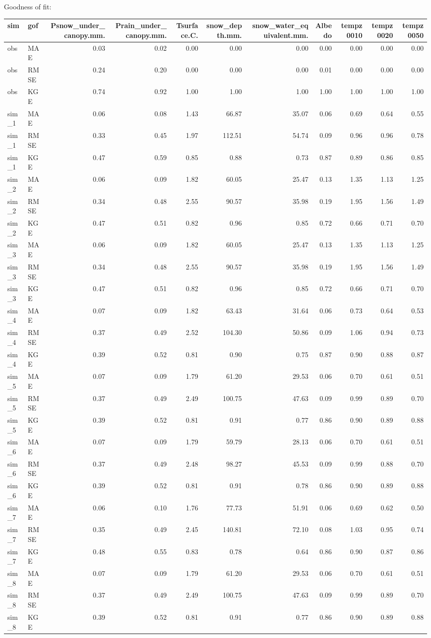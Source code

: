 \documentclass[
]{article}
\begin{document}
Goodness of fit:

\begin{longtable}[]{@{}llrrrrrrrrr@{}}
\toprule
sim & gof & Psnow\_under\_canopy.mm. & Prain\_under\_canopy.mm. &
Tsurface.C. & snow\_depth.mm. & snow\_water\_equivalent.mm. & Albedo &
tempz0010 & tempz0020 & tempz0050\tabularnewline
\midrule
\endhead
obs & MAE & 0.03 & 0.02 & 0.00 & 0.00 & 0.00 & 0.00 & 0.00 & 0.00 &
0.00\tabularnewline
obs & RMSE & 0.24 & 0.20 & 0.00 & 0.00 & 0.00 & 0.01 & 0.00 & 0.00 &
0.00\tabularnewline
obs & KGE & 0.74 & 0.92 & 1.00 & 1.00 & 1.00 & 1.00 & 1.00 & 1.00 &
1.00\tabularnewline
sim\_1 & MAE & 0.06 & 0.08 & 1.43 & 66.87 & 35.07 & 0.06 & 0.69 & 0.64 &
0.55\tabularnewline
sim\_1 & RMSE & 0.33 & 0.45 & 1.97 & 112.51 & 54.74 & 0.09 & 0.96 & 0.96
& 0.78\tabularnewline
sim\_1 & KGE & 0.47 & 0.59 & 0.85 & 0.88 & 0.73 & 0.87 & 0.89 & 0.86 &
0.85\tabularnewline
sim\_2 & MAE & 0.06 & 0.09 & 1.82 & 60.05 & 25.47 & 0.13 & 1.35 & 1.13 &
1.25\tabularnewline
sim\_2 & RMSE & 0.34 & 0.48 & 2.55 & 90.57 & 35.98 & 0.19 & 1.95 & 1.56
& 1.49\tabularnewline
sim\_2 & KGE & 0.47 & 0.51 & 0.82 & 0.96 & 0.85 & 0.72 & 0.66 & 0.71 &
0.70\tabularnewline
sim\_3 & MAE & 0.06 & 0.09 & 1.82 & 60.05 & 25.47 & 0.13 & 1.35 & 1.13 &
1.25\tabularnewline
sim\_3 & RMSE & 0.34 & 0.48 & 2.55 & 90.57 & 35.98 & 0.19 & 1.95 & 1.56
& 1.49\tabularnewline
sim\_3 & KGE & 0.47 & 0.51 & 0.82 & 0.96 & 0.85 & 0.72 & 0.66 & 0.71 &
0.70\tabularnewline
sim\_4 & MAE & 0.07 & 0.09 & 1.82 & 63.43 & 31.64 & 0.06 & 0.73 & 0.64 &
0.53\tabularnewline
sim\_4 & RMSE & 0.37 & 0.49 & 2.52 & 104.30 & 50.86 & 0.09 & 1.06 & 0.94
& 0.73\tabularnewline
sim\_4 & KGE & 0.39 & 0.52 & 0.81 & 0.90 & 0.75 & 0.87 & 0.90 & 0.88 &
0.87\tabularnewline
sim\_5 & MAE & 0.07 & 0.09 & 1.79 & 61.20 & 29.53 & 0.06 & 0.70 & 0.61 &
0.51\tabularnewline
sim\_5 & RMSE & 0.37 & 0.49 & 2.49 & 100.75 & 47.63 & 0.09 & 0.99 & 0.89
& 0.70\tabularnewline
sim\_5 & KGE & 0.39 & 0.52 & 0.81 & 0.91 & 0.77 & 0.86 & 0.90 & 0.89 &
0.88\tabularnewline
sim\_6 & MAE & 0.07 & 0.09 & 1.79 & 59.79 & 28.13 & 0.06 & 0.70 & 0.61 &
0.51\tabularnewline
sim\_6 & RMSE & 0.37 & 0.49 & 2.48 & 98.27 & 45.53 & 0.09 & 0.99 & 0.88
& 0.70\tabularnewline
sim\_6 & KGE & 0.39 & 0.52 & 0.81 & 0.91 & 0.78 & 0.86 & 0.90 & 0.89 &
0.88\tabularnewline
sim\_7 & MAE & 0.06 & 0.10 & 1.76 & 77.73 & 51.91 & 0.06 & 0.69 & 0.62 &
0.50\tabularnewline
sim\_7 & RMSE & 0.35 & 0.49 & 2.45 & 140.81 & 72.10 & 0.08 & 1.03 & 0.95
& 0.74\tabularnewline
sim\_7 & KGE & 0.48 & 0.55 & 0.83 & 0.78 & 0.64 & 0.86 & 0.90 & 0.87 &
0.86\tabularnewline
sim\_8 & MAE & 0.07 & 0.09 & 1.79 & 61.20 & 29.53 & 0.06 & 0.70 & 0.61 &
0.51\tabularnewline
sim\_8 & RMSE & 0.37 & 0.49 & 2.49 & 100.75 & 47.63 & 0.09 & 0.99 & 0.89
& 0.70\tabularnewline
sim\_8 & KGE & 0.39 & 0.52 & 0.81 & 0.91 & 0.77 & 0.86 & 0.90 & 0.89 &
0.88\tabularnewline
\bottomrule
\end{longtable}
\end{document}
